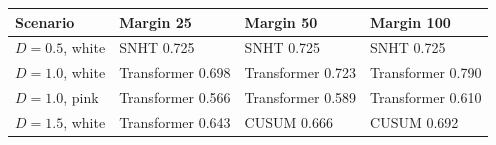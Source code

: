 \begin{tabular}{llll}
\toprule
Scenario & Margin 25 & Margin 50 & Margin 100 \\
\midrule
\(D=0.5\), white & SNHT 0.725 & SNHT 0.725 & SNHT 0.725 \\
\(D=1.0\), white & Transformer 0.698 & Transformer 0.723 & Transformer 0.790 \\
\(D=1.0\), pink & Transformer 0.566 & Transformer 0.589 & Transformer 0.610 \\
\(D=1.5\), white & Transformer 0.643 & CUSUM 0.666 & CUSUM 0.692 \\
\bottomrule
\end{tabular}
